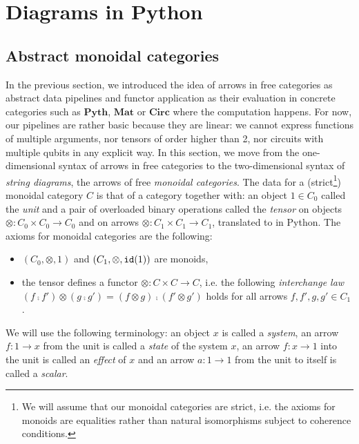 
\section{Diagrams in Python} \label{section:monoidal}

\subsection{Abstract monoidal categories}

In the previous section, we introduced the idea of arrows in free categories as abstract data pipelines and functor application as their evaluation in concrete categories such as $\mathbf{Pyth}$, $\mathbf{Mat}$ or $\mathbf{Circ}$ where the computation happens.
For now, our pipelines are rather basic because they are linear: we cannot express functions of multiple arguments, nor tensors of order higher than 2, nor circuits with multiple qubits in any explicit way.
In this section, we move from the one-dimensional syntax of arrows in free categories to the two-dimensional syntax of \emph{string diagrams}, the arrows of free \emph{monoidal categories}.
The data for a (strict\footnote
{We will assume that our monoidal categories are strict, i.e. the axioms for monoids are equalities rather than natural isomorphisms subject to coherence conditions.}) monoidal category $C$ is that of a category together with:
an object $1 \in C_0$ called the \emph{unit} and a pair of overloaded binary operations called the \emph{tensor} on objects $\otimes : C_0 \times C_0 \to C_0$ and on arrows $\otimes : C_1 \times C_1 \to C_1$, translated to  in Python.
The axioms for monoidal categories are the following:
\begin{itemize}
\item $(C_0, \otimes, 1)$ and $(C_1, \otimes, \mathtt{id}(1))$ are monoids,
\item the tensor defines a functor $\otimes : C \times C \to C$, i.e. the following \emph{interchange law} $(f \fcmp f') \otimes (g \fcmp g') = (f \otimes g) \fcmp (f' \otimes g')$ holds for all arrows $f, f', g, g' \in C_1$.
\end{itemize}
We will use the following terminology: an object $x$ is called a \emph{system}, an arrow $f : 1 \to x$ from the unit is called a \emph{state} of the system $x$, an arrow $f : x \to 1$ into the unit is called an \emph{effect} of $x$ and an arrow $a : 1 \to 1$ from the unit to itself is called a \emph{scalar}.

